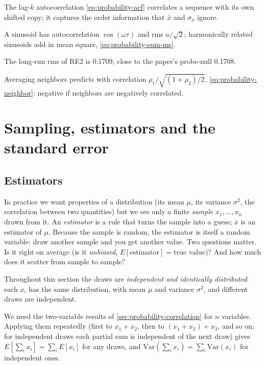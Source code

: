 \begin{keyideas}

\item The lag-$k$ autocorrelation \cref{eq:probability-acf} correlates a sequence with its own shifted copy; it captures the order information that $\bar x$ and $\sigma_x$ ignore.
\item A sinusoid has autocorrelation $\cos(\omega\tau)$ and rms $a/\sqrt2$; harmonically related sinusoids add in mean square, \cref{eq:probability-sum-ms}.
\item The long-run rms of RE2 is 0.1709, close to the paper's probe-null 0.1708.
\item Averaging neighbors predicts with correlation $\rho_1/\sqrt{(1+\rho_2)/2}$, \cref{eq:probability-neighbor}: negative if neighbors are negatively correlated.

\end{keyideas}

\section{Sampling, estimators and the standard error}\label{sec:probability-sampling}

\subsection{Estimators}

In practice we want properties of a distribution (its mean $\mu$, its variance $\sigma^2$, the correlation between two quantities) but we see only a finite \emph{sample} $x_1,\dots,x_n$ drawn from it. An \emph{estimator} is a rule that turns the sample into a guess; $\bar x$ is an estimator of $\mu$. Because the sample is random, the estimator is itself a random variable: draw another sample and you get another value. Two questions matter. Is it right on average (is it \emph{unbiased}, $E[\text{estimator}]=\text{true value}$)? And how much does it scatter from sample to sample?

Throughout this section the draws are \emph{independent and identically distributed}: each $x_i$ has the same distribution, with mean $\mu$ and variance $\sigma^2$, and different draws are independent.

We need the two-variable results of \cref{sec:probability-correlation} for $n$ variables. Applying them repeatedly (first to $x_1+x_2$, then to $(x_1+x_2)+x_3$, and so on; for independent draws each partial sum is independent of the next draw) gives $E[\sum_ix_i]=\sum_iE[x_i]$ for any draws, and $\mathrm{Var}(\sum_ix_i)=\sum_i\mathrm{Var}(x_i)$ for independent ones.

